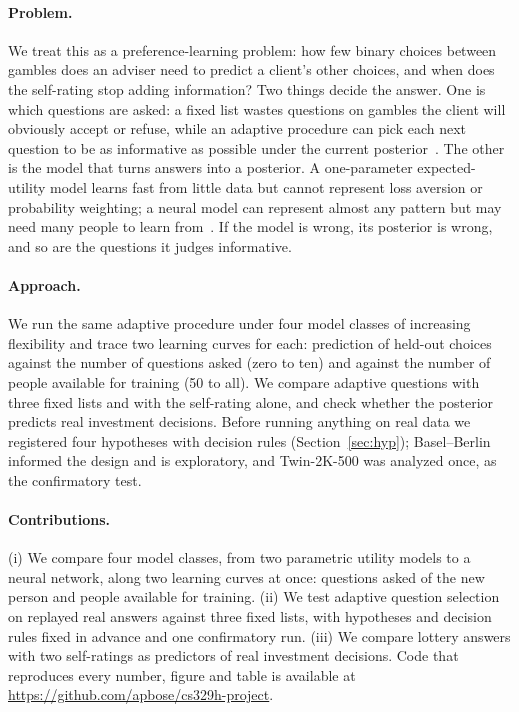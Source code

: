 \documentclass{article}
\begin{document}
\paragraph{Problem.} We treat this as a preference-learning problem: how few binary choices between gambles does an adviser need to predict a client's other choices, and when does the self-rating stop adding information? Two things decide the answer. One is which questions are asked: a fixed list wastes questions on gambles the client will obviously accept or refuse, while an adaptive procedure can pick each next question to be as informative as possible under the current posterior~\citep{chaloner1995,houlsby2011,chapman2018dose}. The other is the model that turns answers into a posterior. A one-parameter expected-utility model learns fast from little data but cannot represent loss aversion or probability weighting; a neural model can represent almost any pattern but may need many people to learn from~\citep{peterson2021,bourgin2019}. If the model is wrong, its posterior is wrong, and so are the questions it judges informative.

\paragraph{Approach.} We run the same adaptive procedure under four model classes of increasing flexibility and trace two learning curves for each: prediction of held-out choices against the number of questions asked (zero to ten) and against the number of people available for training (50 to all). We compare adaptive questions with three fixed lists and with the self-rating alone, and check whether the posterior predicts real investment decisions. Before running anything on real data we registered four hypotheses with decision rules (Section~\ref{sec:hyp}); Basel--Berlin informed the design and is exploratory, and Twin-2K-500 was analyzed once, as the confirmatory test.

\paragraph{Contributions.} (i) We compare four model classes, from two parametric utility models to a neural network, along two learning curves at once: questions asked of the new person and people available for training. (ii) We test adaptive question selection on replayed real answers against three fixed lists, with hypotheses and decision rules fixed in advance and one confirmatory run. (iii) We compare lottery answers with two self-ratings as predictors of real investment decisions. Code that reproduces every number, figure and table is available at \url{https://github.com/apbose/cs329h-project}.
\end{document}
